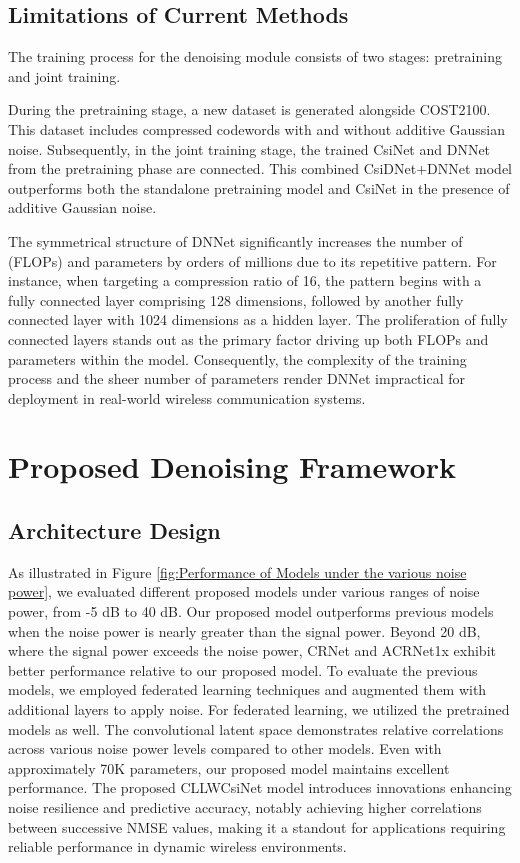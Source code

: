 \documentclass[lettersize,journal]{IEEEtran}
\begin{document}
\subsection{Limitations of Current Methods}
The training process for the denoising module consists of two stages: pretraining and joint training.

During the pretraining stage, a new dataset is generated alongside COST2100. This dataset includes compressed codewords with and without additive Gaussian noise. Subsequently, in the joint training stage, the trained CsiNet and DNNet from the pretraining phase are connected. This combined CsiDNet+DNNet model outperforms both the standalone pretraining model and CsiNet in the presence of additive Gaussian noise. 

The symmetrical structure of DNNet significantly increases the number of (FLOPs) and parameters by orders of millions due to its repetitive pattern. For instance, when targeting a compression ratio of 16, the pattern begins with a fully connected layer comprising 128 dimensions, followed by another fully connected layer with 1024 dimensions as a hidden layer. The proliferation of fully connected layers stands out as the primary factor driving up both FLOPs and parameters within the model. Consequently, the complexity of the training process and the sheer number of parameters render DNNet impractical for deployment in real-world wireless communication systems.

\section{Proposed Denoising Framework}
\subsection{Architecture Design}
As illustrated in Figure \ref{fig:Performance of Models under the various noise power}, we evaluated different proposed models under various ranges of noise power, from -5 dB to 40 dB. Our proposed model outperforms previous models when the noise power is nearly greater than the signal power. Beyond 20 dB, where the signal power exceeds the noise power, CRNet \cite{abn} and ACRNet1x \cite{abx} exhibit better performance relative to our proposed model. To evaluate the previous models, we employed federated learning techniques and augmented them with additional layers to apply noise. For federated learning, we utilized the pretrained models as well. The convolutional latent space demonstrates relative correlations across various noise power levels compared to other models. Even with approximately 70K parameters, our proposed model maintains excellent performance. The proposed CLLWCsiNet model introduces innovations enhancing noise resilience and predictive accuracy, notably achieving higher correlations between successive NMSE values, making it a standout for applications requiring reliable performance in dynamic wireless environments.
\end{document}

